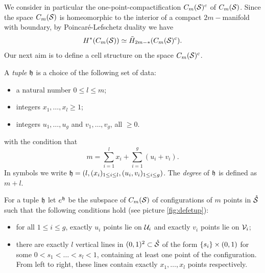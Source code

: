 We consider in particular the one-point-compactification $C_m(\mathcal{S})^c$ of $C_m(\mathcal{S})$.
Since the space $C_m(\mathcal{S})$ is homeomorphic to the interior of a compact
$2m-$manifold with boundary, by Poincaré-Lefschetz
duality we have
\[
 H^*(C_m(\mathcal{S}))\simeq \tilde H_{2m-*}(C_m(\mathcal{S})^c).
\]
Our next aim is to define a cell structure on the space $C_m(\mathcal{S})^c$.
\begin{defn}
\label{defn:ehopen}
A \emph{tuple} $\mathfrak{h}$ is a choice of the following set of data:
 \begin{itemize}
  \item a natural number $0\leq l\leq m$;
  \item integers $x_1,\dots,x_l\geq 1$;
  \item integers $u_1,\dots,u_g$ and $v_1,\dots,v_g$, all $\geq 0$.
 \end{itemize}
with the condition that
\[
 m=\sum_{i=1}^lx_i+\sum_{i=1}^g(u_i+v_i).
\]
In symbols we write $\mathfrak{h}=(l,(x_i)_{1\leq i\leq l},(u_i,v_i)_{1\leq i\leq g})$.
The \emph{degree} of $\mathfrak{h}$ is defined as $m+l$.

For a tuple $\mathfrak{h}$ let $e^{\mathfrak{h}}$ be the subspace
of $C_m(\mathcal{S})$ of configurations of $m$ points in $\mathring{\mathcal{S}}$ such that the following conditions hold
(see picture \ref{fig:defetup}):
\begin{itemize}
 \item for all $1\leq i\leq g$, exactly $u_i$ points lie on $\mathcal{U}_i$
 and exactly $v_i$ points lie on $\mathcal{V}_i$;
 \item there are exactly $l$ vertical lines in $(0,1)^2\subset\mathring{\mathcal{S}}$ of the
 form $\left\{s_i\right\}\times(0,1)$ for some $0<s_1<\dots<s_l<1$, containing at least one
 point of the configuration. From left to right, these lines contain exactly $x_1,\dots,x_l$ points
 respectively.
\end{itemize}
\end{defn}


